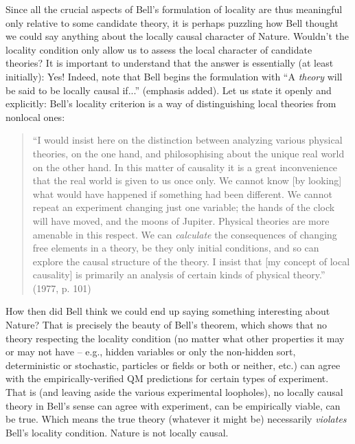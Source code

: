 \documentclass[aps,prc,twocolumn]{revtex4}
\begin{document}
Since all the crucial aspects of Bell's formulation of locality are
thus meaningful only relative to some candidate theory, it is perhaps 
puzzling how Bell thought we could
say anything about the locally causal character of Nature.  Wouldn't
the locality condition only allow us to assess the local character of
candidate theories?  It is important to understand that the
answer is essentially (at least initially):  Yes!  Indeed, note that
Bell begins the formulation with ``A \emph{theory} will be said to be 
locally causal if...'' (emphasis added).   Let us state it openly and
explicitly:  Bell's locality criterion is a way of distinguishing
local theories from nonlocal ones:  
\begin{quote}
``I would insist here on the distinction
between analyzing various physical theories, on the one hand, and
philosophising about the unique real world on the other hand.  In this
matter of causality it is a great inconvenience that the real world is
given to us once only.  We cannot know [by looking] what would have 
happened if something had been different.  We cannot repeat an
experiment changing just one variable; the hands of the clock will
have moved, and the moons of Jupiter.   Physical 
theories are more amenable in this respect.  We can \emph{calculate}
the consequences of changing free elements in a theory, be they only
initial conditions, and so can explore the causal 
structure of the theory.  I insist that [my concept of local causality]
is primarily an analysis of certain kinds of physical theory.''
(1977, p. 101)
\end{quote}
How then did Bell think we could end up saying something interesting
about Nature?  That is precisely the beauty of Bell's theorem, which
shows that no theory respecting the locality condition (no matter what
other properties it may or may not have -- e.g., hidden variables or
only the non-hidden sort, deterministic or stochastic, particles or
fields or both or neither, etc.) can agree with the
empirically-verified QM predictions for certain types of experiment.
That is (and leaving aside the various experimental loopholes), no 
locally causal theory in Bell's sense
can agree with experiment, can be empirically viable, can be
true.  Which means the true theory (whatever it might be) necessarily
\emph{violates} Bell's locality condition.  Nature is not locally
causal.  
\end{document}
